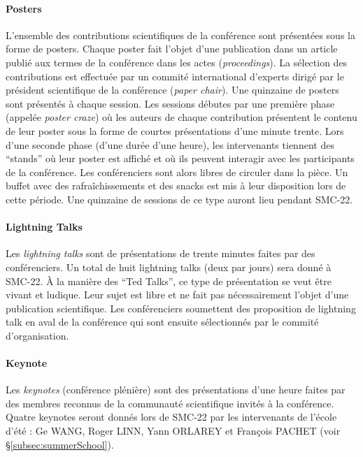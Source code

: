 \documentclass[fontsize=12pt]{scrartcl} %
\numberwithin{equation}{section} %
\numberwithin{table}{section} %
\begin{document}
\paragraph{\textbf{Posters}} L'ensemble des contributions scientifiques de la conférence sont présentées sous la forme de posters. Chaque poster fait l'objet d'une publication dans un article publié aux termes de la conférence dans les actes (\textit{proceedings}). La sélection des contributions est effectuée par un commité international d'experts dirigé par le président scientifique de la conférence (\textit{paper chair}). Une quinzaine de posters sont présentés à chaque session. Les sessions débutes par une première phase (appelée \textit{poster craze}) où les auteurs de chaque contribution présentent le contenu de leur poster sous la forme de courtes présentations d'une minute trente. Lors d'une seconde phase (d'une durée d'une heure), les intervenants tiennent des ``stands'' où leur poster est affiché et où ils peuvent interagir avec les participants de la conférence. Les conférenciers sont alors libres de circuler dans la pièce. Un buffet avec des rafraîchissements et des snacks est mis à leur disposition lors de cette période. Une quinzaine de sessions de ce type auront lieu pendant SMC-22.

\paragraph{\textbf{Lightning Talks}} Les \textit{lightning talks} sont de présentations de trente minutes faites par des conférenciers. Un total de huit lightning talks (deux par jours) sera donné à SMC-22. À la manière des ``Ted Talks'', ce type de présentation se veut être vivant et ludique. Leur sujet est libre et ne fait pas nécessairement l'objet d'une publication scientifique. Les conférenciers soumettent des proposition de lightning talk en aval de la conférence qui sont ensuite sélectionnés par le commité d'organisation. 

\paragraph{\textbf{Keynote}} Les \textit{keynotes} (conférence plénière) sont des présentations d'une heure faites par des membres reconnus de la communauté scientifique invités à la conférence. Quatre keynotes seront donnés lors de SMC-22 par les intervenants de l'école d'été : Ge WANG, Roger LINN, Yann ORLAREY et François PACHET (voir \S\ref{subsec:summerSchool}).
\end{document}
